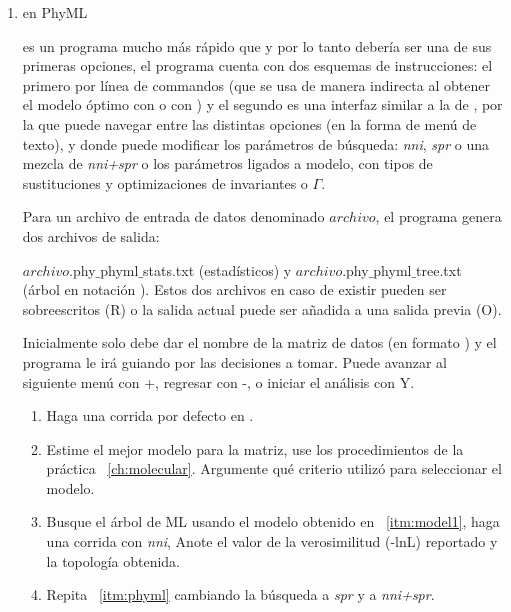 \begin{enumerate}
\item{en PhyML}

   es un programa mucho m\'as r\'apido que  y  por lo tanto deber\'ia ser una de sus primeras opciones, el programa cuenta con dos esquemas de instrucciones: el primero por l\'inea de commandos (que se usa de manera indirecta al obtener el modelo \'optimo con  o con ) y el segundo es una interfaz similar a la de , por la que puede navegar entre las distintas opciones (en la forma de men\'u de texto), y donde puede modificar los par\'ametros de b\'usqueda: \textit{nni}, \textit{spr} o una mezcla de \textit{nni+spr} o los par\'ametros ligados a modelo, con tipos de sustituciones y optimizaciones de invariantes o $\Gamma$.

  Para un archivo de entrada de datos denominado $archivo$, el programa genera dos archivos de salida: 
  
  $archivo$.phy$\_$phyml$\_$stats.txt (estad\'isticos) y $archivo$.phy$\_$phyml$\_$tree.txt (\'arbol en notaci\'on ). 
  Estos dos archivos en caso de existir pueden ser sobreescritos (R) o la salida actual puede ser a\~nadida a una salida previa (O).

  Inicialmente solo debe dar el nombre de la matriz de datos (en formato ) y el programa le ir\'a guiando por las decisiones a tomar. Puede avanzar al siguiente men\'u con +, regresar con -, o iniciar el an\'alisis con Y.

	\begin{enumerate}
		\item Haga una corrida por defecto en .
		
		
		\item \label{itm:model1} Estime el mejor modelo para la matriz, use los procedimientos de la pr\'actica ~\ref{ch:molecular}. Argumente qu\'e criterio utiliz\'o para seleccionar el modelo.
		
		\item \label{itm:phyml} Busque el \'arbol de ML usando el modelo obtenido en ~\ref{itm:model1}, haga una corrida con \textit{nni},  Anote el valor de la verosimilitud (-lnL) reportado y la topolog\'ia obtenida.
		
		\item Repita ~\ref{itm:phyml} cambiando la b\'usqueda a \textit{spr} y a \textit{nni+spr}.
		

\end{enumerate}
\end{enumerate}
